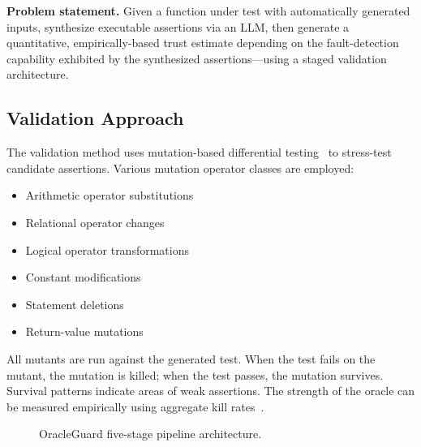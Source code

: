 \documentclass[conference]{IEEEtran}
\begin{document}
\textbf{Problem statement.} Given a function under test with automatically generated inputs, synthesize executable assertions via an LLM, then generate a quantitative, empirically-based trust estimate depending on the fault-detection capability exhibited by the synthesized assertions---using a staged validation architecture.

\subsection{Validation Approach}

The validation method uses mutation-based differential testing~\cite{jia2011mutation,papadakis2019mutation} to stress-test candidate assertions. Various mutation operator classes are employed:

\begin{itemize}
\item Arithmetic operator substitutions
\item Relational operator changes
\item Logical operator transformations
\item Constant modifications
\item Statement deletions
\item Return-value mutations
\end{itemize}

All mutants are run against the generated test. When the test fails on the mutant, the mutation is killed; when the test passes, the mutation survives. Survival patterns indicate areas of weak assertions. The strength of the oracle can be measured empirically using aggregate kill rates~\cite{jia2011mutation}.

\begin{figure}[t]
\centering
{}
\caption{OracleGuard five-stage pipeline architecture.}
\label{fig:og-pipeline}
\end{figure}
\end{document}
